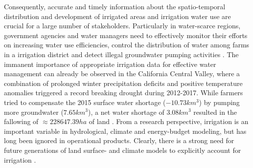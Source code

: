 \documentclass[hess, manuscript]{copernicus}
\begin{document}
Consequently, accurate and timely information about the spatio-temporal distribution and development of irrigated areas and irrigation water use are crucial for a large number of stakeholders. Particularly in water-scarce regions, government agencies and water managers need to effectively monitor their efforts on increasing water use efficiencies, control the distribution of water among farms in a irrigation district and detect illegal groundwater pumping activities \citep{Siebert2010,taylor-2012}. The immanent importance of appropriate irrigation data for effective water management can already be observed in the California Central Valley, where a combination of prolonged winter precipitation deficits and positive temperature anomalies triggered a record breaking drought during 2012-2017. While farmers tried to compensate the 2015 surface water shortage ($-10.73 km^{3}$) by pumping more groundwater ($7.65 km^{3}$), a net water shortage of $3.08 km^{3}$ resulted in the fallowing of $\approx 228647.39 ha$ of land \citep{howitt2015}. From a research perspective, irrigation is an important variable in hydrological, climate and energy-budget modeling, but has long been ignored in operational products. Clearly, there is a strong need for future generations of land surface- and climate models to explicitly account for irrigation \citep{gibson2017case}.

\end{document}
